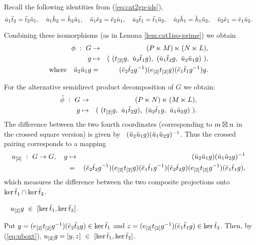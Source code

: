 \noindent
Recall the following identities from (\ref{eq:cat2gp-ids}), 
$$
\dot{u}_1\ddot{t}_2 = \ddot{t}_2\ddot{u}_1, \quad
\dot{u}_1\ddot{h}_2 = \ddot{h}_2\ddot{u}_1, \quad
\ddot{u}_1\ddot{e}_2 = \ddot{e}_2\dot{u}_1, \quad
\dot{u}_2\ddot{t}_1 = \ddot{t}_1\ddot{u}_2, \quad
\dot{u}_2\ddot{h}_1 = \ddot{h}_1\ddot{u}_2, \quad
\ddot{u}_2\ddot{e}_1 = \ddot{e}_1\dot{u}_2. 
$$

\noindent
Combining these isomorphisms (as in Lemma \ref{lem:cat1iso-prime}) we obtain
\begin{eqnarray*}
\phi ~:~ G & \to & (P \ltimes M)\ltimes(N \ltimes L), \\
    g & \mapsto & (~(t_{[2]}g,~ \dot{u}_2\ddot{t}_1 g),~
        (\dot{u}_1\ddot{t}_2 g,~ \ddot{u}_2\ddot{u}_1 g)~), \\
\mbox{where}\quad \ddot{u}_2\ddot{u}_1 g
   & = & (\ddot{e}_2\ddot{t}_2 g^{-1})(e_{[2]}t_{[2]}g)(\ddot{e}_1\ddot{t}_1 g^{-1})g.
\end{eqnarray*}

\noindent
For the alternative semidirect product decomposition of $G$ we obtain: 
\begin{eqnarray*}
\tilde{\phi} ~:~ G & \to & (P \ltimes N)\ltimes(M \ltimes L), \\
    g & \mapsto & (~(t_{[2]}g,~ \dot{u}_1\ddot{t}_2 g),~
        (\dot{u}_2\ddot{t}_1 g,~ \ddot{u}_1\ddot{u}_2 g)~).\\ 
\end{eqnarray*}
The difference between the two fourth coordinates 
(corresponding to $m \boxtimes n$ in the crossed square version) 
is given by~ 
$(\ddot{u}_2\ddot{u}_1 g)(\ddot{u}_1\ddot{u}_2 g)^{-1}$. 
Thus the crossed pairing corresponds to a mapping
\begin{eqnarray} \label{eq:uboxt}
u_{[2]} ~:~ G \to G, \quad g 
  & \mapsto & (\ddot{u}_2\ddot{u}_1 g)(\ddot{u}_1\ddot{u}_2 g)^{-1} \\
  &=&  (\ddot{e}_2\ddot{t}_2 g^{-1})(e_{[2]}t_{[2]}g)(\ddot{e}_1\ddot{t}_1 g^{-1})
       (\ddot{e}_2\ddot{t}_2 g)(e_{[2]}t_{[2]}g^{-1})(\ddot{e}_1\ddot{t}_1 g), \nonumber
\end{eqnarray}
which measures the difference between the two composite projections onto
$\ker\ddot{t}_1 \cap \ker\ddot{t}_2$.

\begin{lem}~  $u_{[2]}g ~\in~ [\ker\ddot{t}_1,\ker\ddot{t}_2]$.
\end{lem}
\begin{pf}
Put  $y = (e_{[2]}t_{[2]}g^{-1})(\ddot{e}_2\ddot{t}_2 g) \in \ker \ddot{t}_1$
and  $z = (e_{[2]}t_{[2]}g^{-1})(\ddot{e}_1\ddot{t}_1 g) \in \ker \ddot{t}_2$.
Then, by (\ref{eq:uboxt}),  
$u_{[2]}g = [y,z] ~\in~ [\ker\ddot{t}_1,\ker\ddot{t}_2]$.
\end{pf}

